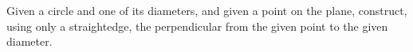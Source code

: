 Given a circle and one of its diameters,
and given a point on the plane,  %
construct, using only a straightedge,
the perpendicular from the given point to the given diameter.

